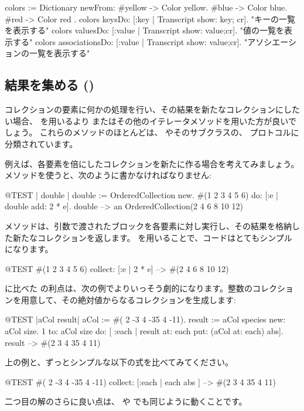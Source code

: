 \documentclass[a4paper,10pt,twoside]{book}
\begin{document}
\begin{code}{}
colors := Dictionary newFrom: { #yellow -> Color yellow. #blue -> Color blue. #red -> Color red }.
colors keysDo: [:key | Transcript show: key; cr].                    "キーの一覧を表示する"
colors valuesDo: [:value | Transcript show: value;cr].            "値の一覧を表示する"
colors associationsDo: [:value | Transcript show: value;cr].  "アソシエーションの一覧を表示する"
\end{code}

\subsection{結果を集める ()}
コレクションの要素に何かの処理を行い、その結果を新たなコレクションにしたい場合、 を用いるより またはその他のイテレータメソッドを用いた方が良いでしょう。
これらのメソッドのほとんどは、 やそのサブクラスの、 プロトコルに分類されています。

例えば、各要素を倍にしたコレクションを新たに作る場合を考えてみましょう。 メソッドを使うと、次のように書かなければなりません:

\begin{code}{@TEST | double |}
double := OrderedCollection new.
#(1 2 3 4 5 6) do: [:e | double add: 2 * e].
double --> an OrderedCollection(2 4 6 8 10 12)
\end{code}

\noindent
{} メソッドは、引数で渡されたブロックを各要素に対し実行し、その結果を格納した新たなコレクションを返します。
 を用いることで、コードはとてもシンプルになります。
\begin{code}{@TEST}
#(1 2 3 4 5 6) collect: [:e | 2 * e] --> #(2 4 6 8 10 12)
\end{code}

 に比べた  の利点は、次の例でよりいっそう劇的になります。整数のコレクションを用意して、その絶対値からなるコレクションを生成します:

\begin{code}{@TEST |aCol result|}
aCol :=  #( 2 -3 4 -35 4 -11).
result := aCol species new: aCol size.
1 to: aCol size do: [ :each | result at: each put: (aCol at: each) abs].
result --> #(2 3 4 35 4 11)
\end{code}
\noindent
上の例と、ずっとシンプルな以下の式を比べてみてください。
\begin{code}{@TEST}
#( 2 -3 4 -35 4 -11) collect: [:each | each abs ] --> #(2 3 4 35 4 11)
\end{code}
\noindent
二つ目の解のさらに良い点は、 や  でも同じように動くことです。
\end{document}
